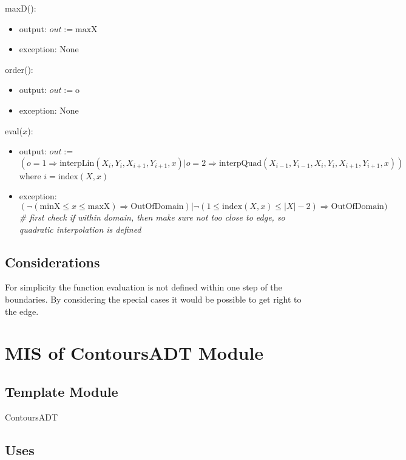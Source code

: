 \documentclass[12pt, titlepage]{article}
\begin{document}
\noindent maxD():
\begin{itemize}
\item output: $out := \mbox{maxX}$
\item exception: None
\end{itemize}

\noindent order():
\begin{itemize}
\item output: $out := \mbox{o}$
\item exception: None
\end{itemize}

\noindent eval($x$):
\begin{itemize}
\item output: $out :=$ $$(o=1 \Rightarrow \mbox{interpLin}(X_i, Y_i,
X_{i+1}, Y_{i+1}, x) | o = 2 \Rightarrow \mbox{interpQuad}(X_{i-1}, Y_{i-1}, X_i, Y_i, X_{i+1},
Y_{i+1}, x) )$$  where $i = \mbox{index}(X, x)$
\item exception: $(\neg(\mbox{minX} \leq x \leq \mbox{maxX}) \Rightarrow
  \mbox{OutOfDomain}) | \neg(1 \leq \mbox{index}(X, x) \leq |X| - 2) \Rightarrow
  \mbox{OutOfDomain})$ \textit{\# first check if within domain, then make sure
    not too close to edge, so quadratic interpolation is defined}
\end{itemize}

\subsection{Considerations}

For simplicity the function evaluation is not defined within one step of the
boundaries.  By considering the special cases it would be possible to get right 
to the edge.

\newpage


\section{MIS of ContoursADT Module} \label{ContoursADT}

\subsection {Template Module}

ContoursADT

\subsection {Uses}
\end{document}
